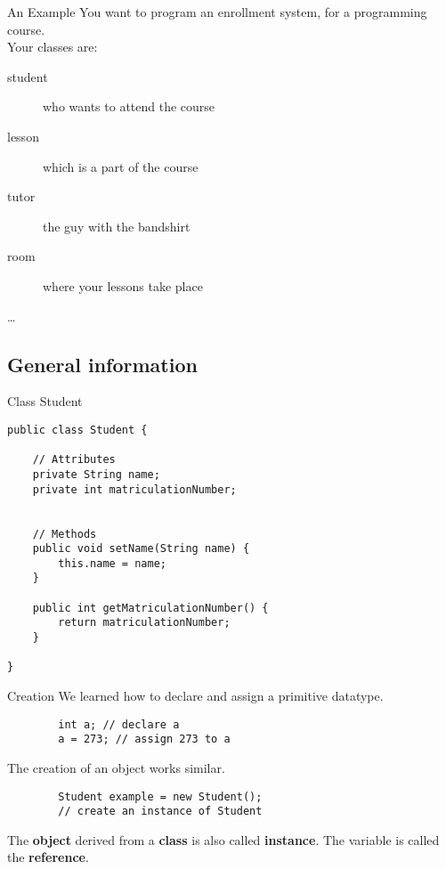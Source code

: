 \begin{frame}{An Example}
    You want to program an enrollment system, for a programming course. \\
    \vspace{1em}
    Your classes are:\\
    \begin{description}
        \item[student] who wants to attend the course
        \item[lesson] which is a part of the course
        \item[tutor] the guy with the bandshirt
        \item[room] where your lessons take place
        \item[\dots]
    \end{description}
\end{frame}

\subsection{General information}

\begin{frame}[fragile]{Class Student}
\begin{lstlisting}
public class Student {

    // Attributes
    private String name; 
    private int matriculationNumber; 
    
    
    // Methods
    public void setName(String name) {
        this.name = name;
    }
    
    public int getMatriculationNumber() {
        return matriculationNumber;
    }
    
}\end{lstlisting}


\end{frame}

\begin{frame}[fragile]{Creation}
    We learned how to declare and assign a primitive datatype.
    
    \begin{lstlisting}
        int a; // declare a
        a = 273; // assign 273 to a \end{lstlisting} 
    
    The creation of an object works similar.
    
    \begin{lstlisting}
        Student example = new Student(); 
        // create an instance of Student \end{lstlisting}
    The \textbf{object} derived from a \textbf{class} is also called \textbf{instance}.
    The variable is called the \textbf{reference}.
\end{frame}

